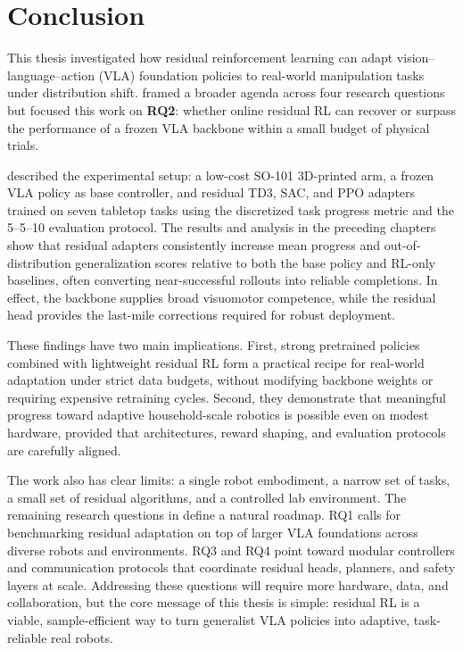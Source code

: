 \chapter{Conclusion}
\label{sec:conclusion}

This thesis investigated how residual reinforcement learning can adapt vision–language–action (VLA) foundation policies to real-world manipulation tasks under distribution shift.  framed a broader agenda across four research questions but focused this work on \textbf{RQ2}: whether online residual RL can recover or surpass the performance of a frozen VLA backbone within a small budget of physical trials.

 described the experimental setup: a low-cost SO-101 3D-printed arm, a frozen VLA policy as base controller, and residual TD3, SAC, and PPO adapters trained on seven tabletop tasks using the discretized task progress metric and the 5--5--10 evaluation protocol. The results and analysis in the preceding chapters show that residual adapters consistently increase mean progress and out-of-distribution generalization scores relative to both the base policy and RL-only baselines, often converting near-successful rollouts into reliable completions. In effect, the backbone supplies broad visuomotor competence, while the residual head provides the last-mile corrections required for robust deployment.

These findings have two main implications. First, strong pretrained policies combined with lightweight residual RL form a practical recipe for real-world adaptation under strict data budgets, without modifying backbone weights or requiring expensive retraining cycles. Second, they demonstrate that meaningful progress toward adaptive household-scale robotics is possible even on modest hardware, provided that architectures, reward shaping, and evaluation protocols are carefully aligned.

The work also has clear limits: a single robot embodiment, a narrow set of tasks, a small set of residual algorithms, and a controlled lab environment. The remaining research questions in  define a natural roadmap. RQ1 calls for benchmarking residual adaptation on top of larger VLA foundations across diverse robots and environments. RQ3 and RQ4 point toward modular controllers and communication protocols that coordinate residual heads, planners, and safety layers at scale. Addressing these questions will require more hardware, data, and collaboration, but the core message of this thesis is simple: residual RL is a viable, sample-efficient way to turn generalist VLA policies into adaptive, task-reliable real robots.

\newpage
